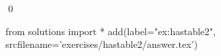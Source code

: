 
\begin{ex} 
  \label{ex:hastable2}
  
  \qed
\end{ex} 
\begin{python0}
from solutions import *
add(label="ex:hastable2",
    srcfilename='exercises/hastable2/answer.tex') 
\end{python0}
